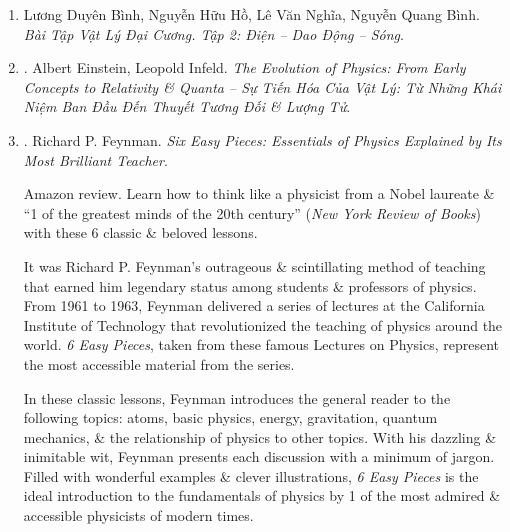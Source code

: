 \documentclass{article}
\begin{document}
\begin{enumerate}
	\item Lương Duyên Bình, Nguyễn Hữu Hồ, Lê Văn Nghĩa, Nguyễn Quang Bình. {\it Bài Tập Vật Lý Đại Cương. Tập 2: Điện -- Dao Động -- Sóng}.
	
	\item \cite{Einstein_Infeld_tien_hoa_Vat_Ly}. Albert Einstein, Leopold Infeld. {\it The Evolution of Physics: From Early Concepts to Relativity \& Quanta -- Sự Tiến Hóa Của Vật Lý: Từ Những Khái Niệm Ban Đầu Đến Thuyết Tương Đối \& Lượng Tử}.\hfill{\sf[done]}
	
	\item \cite{Feyman_Leighton_Sands_6_easy_pieces}. {\sc Richard P. Feynman}. {\it Six Easy Pieces: Essentials of Physics Explained by Its Most Brilliant Teacher}. {}
	
	{\sf Amazon review.} Learn how to think like a physicist from a Nobel laureate \& ``1 of the greatest minds of the 20th century'' ({\it New York Review of Books}) with these 6 classic \& beloved lessons.
	
	It was {\sc Richard P. Feynman}'s outrageous \& scintillating method of teaching that earned him legendary status among students \& professors of physics. From 1961 to 1963, {\sc Feynman} delivered a series of lectures at the California Institute of Technology that revolutionized the teaching of physics around the world. {\it6 Easy Pieces}, taken from these famous Lectures on Physics, represent the most accessible material from the series.
	
	In these classic lessons, {\sc Feynman} introduces the general reader to the following topics: atoms, basic physics, energy, gravitation, quantum mechanics, \& the relationship of physics to other topics. With his dazzling \& inimitable wit, {\sc Feynman} presents each discussion with a minimum of jargon. Filled with wonderful examples \& clever illustrations, {\it6 Easy Pieces} is the ideal introduction to the fundamentals of physics by 1 of the most admired \& accessible physicists of modern times.
	

\end{enumerate}
\end{document}
